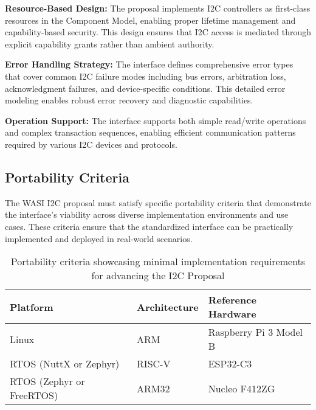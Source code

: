 
\textbf{Resource-Based Design:} The proposal implements I2C controllers as first-class resources in the Component Model, enabling proper lifetime management and capability-based security. This design ensures that I2C access is mediated through explicit capability grants rather than ambient authority.

\textbf{Error Handling Strategy:} The interface defines comprehensive error types that cover common I2C failure modes including bus errors, arbitration loss, acknowledgment failures, and device-specific conditions. This detailed error modeling enables robust error recovery and diagnostic capabilities.

\textbf{Operation Support:} The interface supports both simple read/write operations and complex transaction sequences, enabling efficient communication patterns required by various I2C devices and protocols.

\subsection{Portability Criteria}
\label{subsec:i2c-portability}

The WASI I2C proposal must satisfy specific portability criteria that demonstrate the interface's viability across diverse implementation environments and use cases. These criteria ensure that the standardized interface can be practically implemented and deployed in real-world scenarios.

\begin{table}[h]
	\centering
	\captionsetup{justification=centering}
	\caption{Portability criteria showcasing minimal implementation requirements for advancing the I2C Proposal}
	\label{tab:resallocschemes}
	\begin{tabular}{lll}
		\toprule
		\textbf{Platform} & \textbf{Architecture} & \textbf{Reference Hardware} \\
        \midrule
		Linux & ARM & Raspberry Pi 3 Model B \\
		RTOS (NuttX or Zephyr) & RISC-V & ESP32-C3 \\
        RTOS (Zephyr or FreeRTOS) & ARM32 & Nucleo F412ZG \\
		\bottomrule
	\end{tabular}
\end{table}

